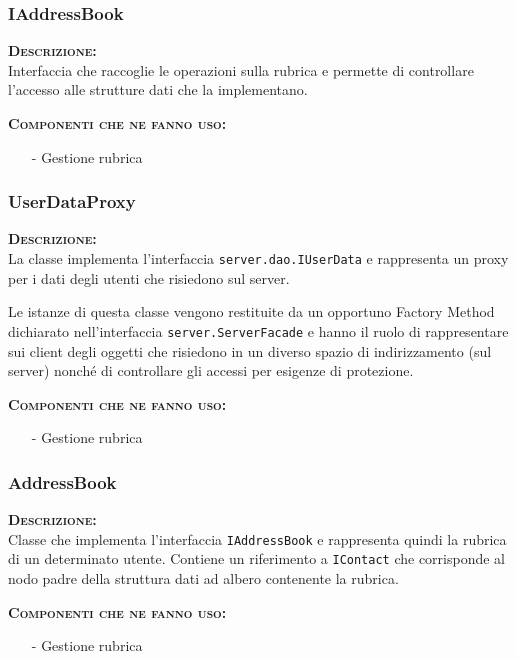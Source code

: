 \subsubsection{IAddressBook}
\begin{description}
	\item{\scshape\bfseries Descrizione:}\\
Interfaccia che raccoglie le operazioni sulla rubrica e permette di controllare l'accesso alle strutture dati che la implementano.
	\item{\scshape\bfseries Componenti che ne fanno uso:}
	\begin{itemize}[noitemsep,nolistsep]
	  \item[-] Gestione rubrica
	\end{itemize}
\end{description}

\subsubsection{UserDataProxy}
\begin{description}
  \item{\scshape\bfseries Descrizione:}\\
La classe implementa l'interfaccia \texttt{server.dao.IUserData} e rappresenta un proxy per i dati degli utenti che risiedono sul server.

Le istanze di questa classe vengono restituite da un opportuno Factory Method dichiarato nell'interfaccia \texttt{server.ServerFacade} e hanno il ruolo di rappresentare sui client degli oggetti che risiedono in un diverso spazio di indirizzamento (sul server) nonché di controllare gli accessi per esigenze di protezione.
  \item{\scshape\bfseries Componenti che ne fanno uso:}
  \begin{itemize}[noitemsep,nolistsep]
    \item[-] Gestione rubrica
  \end{itemize}
\end{description}

\subsubsection{AddressBook}
\begin{description}
	\item{\scshape\bfseries Descrizione:}\\
Classe che implementa l'interfaccia \texttt{IAddressBook} e rappresenta quindi la rubrica di un determinato utente. Contiene un riferimento a \texttt{IContact} che corrisponde al nodo padre della struttura dati ad albero contenente la rubrica.
	\item{\scshape\bfseries Componenti che ne fanno uso:}
	\begin{itemize}[noitemsep,nolistsep]
	  \item[-] Gestione rubrica
	\end{itemize}
\end{description}

